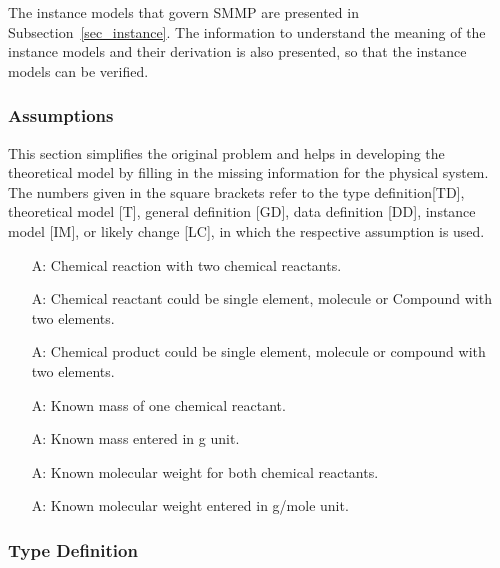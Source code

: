 \documentclass[12pt]{article}
\newcounter{assumpnum} %
\begin{document}
The instance models that govern SMMP are presented in
Subsection~\ref{sec_instance}.  The information to understand the meaning of the
instance models and their derivation is also presented, so that the instance
models can be verified.

\subsubsection{Assumptions} \label{sec_assumpt}

This section simplifies the original problem and helps in developing the
theoretical model by filling in the missing information for the physical
system. The numbers given in the square brackets refer to the type
definition[TD], theoretical model [T], general definition [GD], data definition
[DD], instance model [IM], or likely change [LC], in which the respective
assumption is used.

\begin{itemize}

\item[A\refstepcounter{assumpnum}\theassumpnum \label{Two reactants}:] Chemical
  reaction with two chemical reactants.
\item[A\refstepcounter{assumpnum}\theassumpnum \label{reactant compound}:]
  Chemical reactant could be single element, molecule or Compound with two
  elements.
\item[A\refstepcounter{assumpnum}\theassumpnum \label{product compound}:]
  Chemical product could be single element, molecule or compound with two
  elements.
\item[A\refstepcounter{assumpnum}\theassumpnum \label{Known mass}:] Known mass
  of one chemical reactant.
\item[A\refstepcounter{assumpnum}\theassumpnum \label{Mass unit}:] Known mass
  entered in g unit.
\item[A\refstepcounter{assumpnum}\theassumpnum \label{Known molecular weight}:]
  Known molecular weight for both chemical reactants.
\item[A\refstepcounter{assumpnum}\theassumpnum \label{Molecular weight unit}:]
  Known molecular weight entered in g/mole unit.

\end{itemize}

\subsubsection{Type Definition}\label{Type_Detention}
\end{document}
